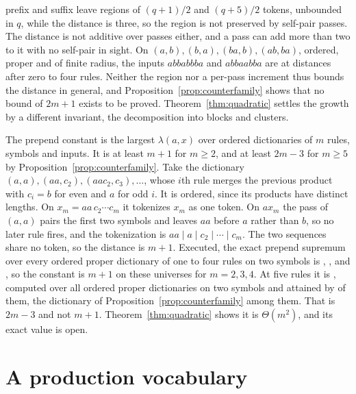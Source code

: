\documentclass[11pt,a4paper]{article}
\theoremstyle{definition}
\theoremstyle{plain}
\begin{document}
prefix and suffix leave regions of \((q + 1)/2\) and \((q + 5)/2\) tokens, unbounded in \(q\), while the distance is
three, so the region is not preserved by self-pair passes. The distance is not additive over passes either, and a pass
can add more than two to it with no self-pair in sight. On \((a,b), (b,a), (ba,b), (ab,ba)\), ordered, proper and of
finite radius, the inputs \(abbabbba\) and \(abbaabba\) are at distances \ObstacleDistances{} after zero to four rules.
Neither the region nor a per-pass increment thus bounds the distance in general, and
Proposition~\ref{prop:counterfamily} shows that no bound of \(2m + 1\) exists to be proved. Theorem~\ref{thm:quadratic}
settles the growth by a different invariant, the decomposition into blocks and clusters.

The prepend constant is the largest \(\lambda(a, x)\) over ordered dictionaries of \(m\) rules, symbols and inputs. It
is at least \(m + 1\) for \(m \ge 2\), and at least \(2m - 3\) for \(m \ge 5\) by Proposition~\ref{prop:counterfamily}.
Take the dictionary \((a,a), (aa, c_2), (aac_2, c_3), \dots\), whose \(i\)th rule merges the previous product with
\(c_i = b\) for even and \(a\) for odd \(i\). It is ordered, since its products have distinct lengths. On
\(x_m = aa\,c_2 \cdots c_m\) it tokenizes \(x_m\) as one token. On \(a x_m\) the pass of \((a, a)\) pairs the first two
symbols and leaves \(aa\) before \(a\) rather than \(b\), so no later rule fires, and the tokenization is
\(aa \mid a \mid c_2 \mid \cdots \mid c_m\). The two sequences share no token, so the distance is \(m + 1\). Executed,
the exact prepend supremum over every ordered proper dictionary of one to four rules on two symbols is
\PrependExactOne{}, \PrependExactTwo{}, \PrependExactThree{} and \PrependExactFour{}, so the constant is \(m + 1\) on
these universes for \(m = 2, 3, 4\). At five rules it is \PrependExactFive{}, computed over all \PrependFiveTables{}
ordered proper dictionaries on two symbols and attained by \PrependFiveAttaining{} of them, the dictionary of
Proposition~\ref{prop:counterfamily} among them. That is \(2m - 3\) and not \(m + 1\). Theorem~\ref{thm:quadratic} shows
it is \(\Theta(m^2)\), and its exact value is open.

\section{A production vocabulary}\label{sec:production}
\end{document}
